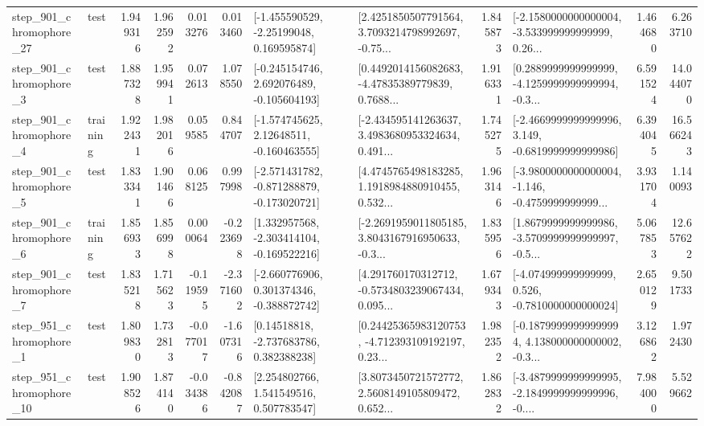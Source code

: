 \begin{tabular}{llrrrrllrlrr}
  step\_901\_chromophore\_27 &      test &      1.949316 &    1.962592 &      0.013276 &  0.013460 &    [-1.455590529, -2.25199048, 0.169595874] &  [2.4251850507791564, 3.7093214798992697, -0.75... &       1.845873 &  [-2.1580000000000004, -3.533999999999999, 0.26... &            1.464680 &          6.263710 \\
   step\_901\_chromophore\_3 &      test &      1.887328 &    1.959941 &      0.072613 &  1.078550 &   [-0.245154746, 2.692076489, -0.105604193] &  [0.4492014156082683, -4.47835389779839, 0.7688... &       1.916331 &  [0.2889999999999999, -4.1259999999999994, -0.3... &            6.591524 &         14.044070 \\
   step\_901\_chromophore\_4 &  training &      1.922431 &    1.982016 &      0.059585 &  0.844707 &    [-1.574745625, 2.12648511, -0.160463555] &  [-2.434595141263637, 3.4983680953324634, 0.491... &       1.745275 &  [-2.4669999999999996, 3.149, -0.6819999999999986] &            6.394045 &         16.566243 \\
   step\_901\_chromophore\_5 &      test &      1.833341 &    1.901466 &      0.068125 &  0.997998 &  [-2.571431782, -0.871288879, -0.173020721] &  [4.4745765498183285, 1.1918984880910455, 0.532... &       1.963146 &  [-3.9800000000000004, -1.146, -0.4759999999999... &            3.931704 &          1.140093 \\
   step\_901\_chromophore\_6 &  training &      1.856933 &    1.856998 &      0.000064 & -0.223698 &   [1.332957568, -2.303414104, -0.169522216] &  [-2.2691959011805185, 3.8043167916950633, -0.3... &       1.835956 &  [1.8679999999999986, -3.5709999999999997, -0.5... &            5.067853 &         12.657622 \\
   step\_901\_chromophore\_7 &      test &      1.835218 &    1.715623 &     -0.119595 & -2.371602 &   [-2.660776906, 0.301374346, -0.388872742] &  [4.291760170312712, -0.5734803239067434, 0.095... &       1.679343 &   [-4.074999999999999, 0.526, -0.7810000000000024] &            2.650129 &          9.501733 \\
   step\_951\_chromophore\_1 &      test &      1.809830 &    1.732813 &     -0.077017 & -1.607316 &     [0.14518818, -2.737683786, 0.382388238] &  [0.24425365983120753, -4.712393109192197, 0.23... &       1.982352 &  [-0.18799999999999994, 4.138000000000002, -0.3... &            3.126862 &          1.972430 \\
  step\_951\_chromophore\_10 &      test &      1.908526 &    1.874140 &     -0.034386 & -0.842087 &     [2.254802766, 1.541549516, 0.507783547] &  [3.8073450721572772, 2.5608149105809472, 0.652... &       1.862832 &  [-3.4879999999999995, -2.1849999999999996, -0.... &            7.984000 &          5.529662 \\

\end{tabular}
